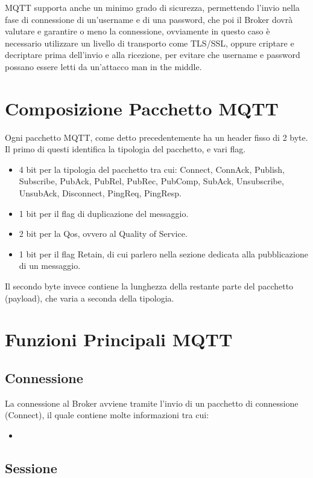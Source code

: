 \documentclass{article}
\begin{document}
MQTT supporta anche un minimo grado di sicurezza, permettendo l'invio nella fase di connessione di un'username e di una password, che poi il Broker dovrà valutare e garantire o meno la connessione, ovviamente in questo caso è necessario utilizzare un livello di transporto come TLS/SSL, oppure criptare e decriptare prima dell'invio e alla ricezione, per evitare che username e password possano essere letti da un'attacco man in the middle.


\section{Composizione Pacchetto MQTT}
Ogni pacchetto MQTT, come detto precedentemente ha un header fisso di 2 byte. Il primo di questi identifica la tipologia del pacchetto, e vari flag.
\begin{itemize}
	\item 4 bit per la tipologia del pacchetto tra cui: Connect, ConnAck, Publish, Subscribe, PubAck, PubRel, PubRec, PubComp, SubAck, Unsubscribe, UnsubAck, Disconnect, PingReq, PingResp.
	\item 1 bit per il flag di duplicazione del messaggio.
	\item 2 bit per la Qos, ovvero al Quality of Service.
	\item 1 bit per il flag Retain, di cui parlero nella sezione dedicata alla pubblicazione di un messaggio.

\end{itemize}Il secondo byte invece contiene la lunghezza della restante parte del pacchetto (payload), che varia a seconda della tipologia.

\section{Funzioni Principali MQTT}

\subsection{Connessione}
La connessione al Broker avviene tramite l'invio di un pacchetto di connessione (Connect), il quale contiene molte informazioni tra cui:

\begin{itemize}
	\item 
\end{itemize}

\subsection{Sessione}
\end{document}
